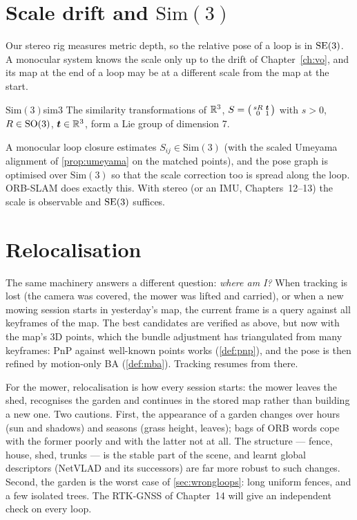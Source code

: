 \section{Scale drift and $\mathrm{Sim}(3)$}

Our stereo rig measures metric depth, so the relative pose of a loop is
in $\mathrm{SE}(3)$. A monocular system knows the scale only up to the drift
of Chapter~\ref{ch:vo}, and its map at the end of a loop may be at a
different scale from the map at the start.

\begin{definition}{$\mathrm{Sim}(3)$}{sim3}
The similarity transformations of $\mathbb{R}^3$, $S=\bigl(\begin{smallmatrix}
sR&\bm{t}\\0&1\end{smallmatrix}\bigr)$ with $s>0$, $R\in\mathrm{SO}(3)$,
$\bm{t}\in\mathbb{R}^3$, form a Lie group of dimension 7.
\end{definition}

A monocular loop closure estimates $S_{ij}\in\mathrm{Sim}(3)$ (with
the scaled Umeyama alignment of \cref{prop:umeyama} on the matched
points), and the pose graph is optimised over $\mathrm{Sim}(3)$ so
that the scale correction too is spread along the loop. ORB-SLAM does
exactly this. With stereo (or an IMU, Chapters~12--13) the scale is
observable and $\mathrm{SE}(3)$ suffices.

\section{Relocalisation}

The same machinery answers a different question: \emph{where am I?}
When tracking is lost (the camera was covered, the mower was lifted and
carried), or when a new mowing session starts in yesterday's map, the
current frame is a query against all keyframes of the map. The best
candidates are verified as above, but now with the map's 3D points,
which the bundle adjustment has triangulated from many keyframes: PnP
against well-known points works (\cref{def:pnp}), and the pose is
then refined by motion-only BA (\cref{def:mba}). Tracking resumes from
there.

\begin{mower}
For the mower, relocalisation is how every session starts: the mower
leaves the shed, recognises the garden and continues in the stored map
rather than building a new one. Two cautions. First, the appearance of
a garden changes over hours (sun and shadows) and seasons (grass height,
leaves); bags of ORB words cope with the former poorly and with the
latter not at all. The structure --- fence, house, shed, trunks --- is
the stable part of the scene, and learnt global descriptors (NetVLAD
and its successors) are far more robust to such changes. Second, the
garden is the worst case of \cref{sec:wrongloops}: long uniform
fences, and a few isolated trees. The RTK-GNSS of Chapter~14 will give
an independent check on every loop.
\end{mower}

